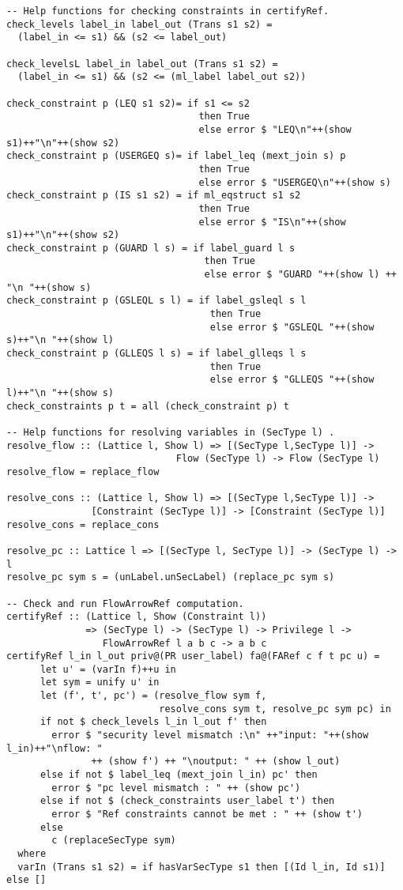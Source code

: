\begin{Verbatim}[fontsize=\footnotesize,frame=lines,
                 framesep=5mm, label={[FlowArrowRef.hs]FlowArrowRef.hs}]
-- Help functions for checking constraints in certifyRef. 
check_levels label_in label_out (Trans s1 s2) = 
  (label_in <= s1) && (s2 <= label_out)

check_levelsL label_in label_out (Trans s1 s2) = 
  (label_in <= s1) && (s2 <= (ml_label label_out s2))

check_constraint p (LEQ s1 s2)= if s1 <= s2 
                                  then True 
                                  else error $ "LEQ\n"++(show s1)++"\n"++(show s2) 
check_constraint p (USERGEQ s)= if label_leq (mext_join s) p 
                                  then True 
                                  else error $ "USERGEQ\n"++(show s)
check_constraint p (IS s1 s2) = if ml_eqstruct s1 s2 
                                  then True 
                                  else error $ "IS\n"++(show s1)++"\n"++(show s2)
check_constraint p (GUARD l s) = if label_guard l s 
                                   then True 
                                   else error $ "GUARD "++(show l) ++ "\n "++(show s)
check_constraint p (GSLEQL s l) = if label_gsleql s l 
                                    then True 
                                    else error $ "GSLEQL "++(show s)++"\n "++(show l)
check_constraint p (GLLEQS l s) = if label_glleqs l s 
                                    then True 
                                    else error $ "GLLEQS "++(show l)++"\n "++(show s)
check_constraints p t = all (check_constraint p) t

-- Help functions for resolving variables in (SecType l) .
resolve_flow :: (Lattice l, Show l) => [(SecType l,SecType l)] -> 
                              Flow (SecType l) -> Flow (SecType l)
resolve_flow = replace_flow

resolve_cons :: (Lattice l, Show l) => [(SecType l,SecType l)] -> 
               [Constraint (SecType l)] -> [Constraint (SecType l)]
resolve_cons = replace_cons

resolve_pc :: Lattice l => [(SecType l, SecType l)] -> (SecType l) -> l
resolve_pc sym s = (unLabel.unSecLabel) (replace_pc sym s)

-- Check and run FlowArrowRef computation. 
certifyRef :: (Lattice l, Show (Constraint l)) 
              => (SecType l) -> (SecType l) -> Privilege l -> 
                 FlowArrowRef l a b c -> a b c
certifyRef l_in l_out priv@(PR user_label) fa@(FARef c f t pc u) =
      let u' = (varIn f)++u in
      let sym = unify u' in
      let (f', t', pc') = (resolve_flow sym f, 
                           resolve_cons sym t, resolve_pc sym pc) in
      if not $ check_levels l_in l_out f' then
        error $ "security level mismatch :\n" ++"input: "++(show l_in)++"\nflow: " 
               ++ (show f') ++ "\noutput: " ++ (show l_out)
      else if not $ label_leq (mext_join l_in) pc' then
        error $ "pc level mismatch : " ++ (show pc') 
      else if not $ (check_constraints user_label t') then
        error $ "Ref constraints cannot be met : " ++ (show t')
      else
        c (replaceSecType sym)   
  where
  varIn (Trans s1 s2) = if hasVarSecType s1 then [(Id l_in, Id s1)] else [] 


\end{Verbatim}
